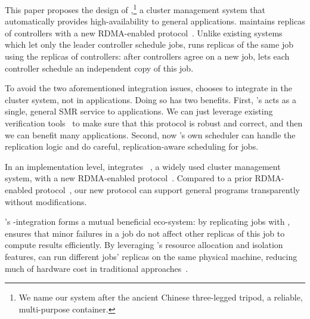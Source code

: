 
This paper proposes the design of \xxx,\footnote{We name our system after the 
ancient Chinese three-legged tripod, a reliable, multi-purpose container.} a 
cluster management system that automatically provides high-availability to 
general applications. \xxx maintains replicas of controllers with a new 
RDMA-enabled \paxos protocol~\cite{falcon:github}. Unlike existing systems which 
let only the leader controller schedule jobs, \xxx runs replicas of the same job 
using the replicas of controllers: after controllers agree on a new job, \xxx 
lets each controller schedule an independent copy of this job.

To avoid the two aforementioned integration issues, \xxx chooses to integrate 
\paxos in the cluster system, not in applications. Doing so has two benefits. 
First, \xxx's \paxos acts as a single, general SMR service to applications. We 
can just leverage existing verification 
tools~\cite{modist:nsdi09,demeter:sosp11} to make sure that this \paxos 
protocol is robust and correct, and then we can benefit many applications. 
Second, now \xxx's own scheduler can handle the replication logic and do 
careful, replication-aware scheduling for jobs.


In an implementation level, \xxx integrates \mesos~\cite{mesos:nsdi11}, a widely 
used cluster management system, with a new RDMA-enabled \paxos 
protocol~\cite{falcon:github}. Compared to a prior RDMA-enabled \paxos 
protocol~\cite{dare:hpdc15}, our new protocol can support general programs 
transparently without modifications.

\xxx's \mesos-\paxos integration forms a mutual beneficial 
eco-system: by replicating jobs with \paxos, 
\xxx ensures that minor failures in a job do not affect other replicas of 
this job to compute results efficiently. By leveraging \mesos's resource 
allocation and isolation features, \xxx can run different jobs' replicas on the 
same physical machine, reducing much of hardware cost in traditional 
\paxos approaches~\cite{crane:sosp15,rex:eurosys14}.


